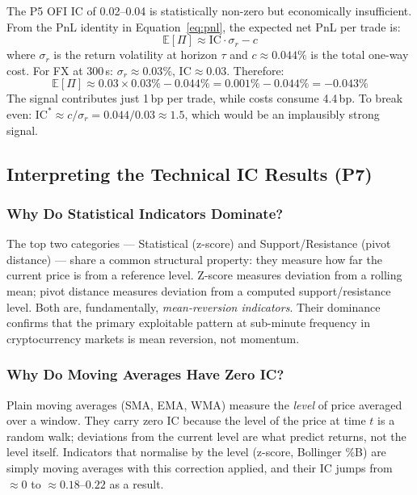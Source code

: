 \documentclass[12pt,a4paper]{article}
\theoremstyle{definition}
\theoremstyle{remark}
\newcommand{\IC}{\mathrm{IC}}
\begin{document}
The P5 OFI IC of 0.02--0.04 is statistically non-zero but
economically insufficient. From the PnL identity in
Equation~\eqref{eq:pnl}, the expected net PnL per trade is:
\begin{equation}
  \mathbb{E}[\Pi] \approx \IC \cdot \sigma_r - c
\end{equation}
where $\sigma_r$ is the return volatility at horizon $\tau$
and $c\approx 0.044\%$ is the total one-way cost. For FX at 300\,s:
$\sigma_r\approx 0.03\%$, $\IC\approx 0.03$. Therefore:
\begin{equation}
  \mathbb{E}[\Pi] \approx 0.03 \times 0.03\% - 0.044\%
    = 0.001\% - 0.044\% = -0.043\%
\end{equation}
The signal contributes just 1\,bp per trade, while costs consume 4.4\,bp.
To break even: $\IC^* \approx c / \sigma_r = 0.044/0.03 \approx 1.5$,
which would be an implausibly strong signal.

\subsection{Interpreting the Technical IC Results (P7)}

\subsubsection{Why Do Statistical Indicators Dominate?}

The top two categories --- Statistical (z-score) and
Support/Resistance (pivot distance) --- share a common structural
property: they measure how far the current price is from a reference
level. Z-score measures deviation from a rolling mean; pivot distance
measures deviation from a computed support/resistance level. Both are,
fundamentally, \emph{mean-reversion indicators}. Their dominance
confirms that the primary exploitable pattern at sub-minute frequency
in cryptocurrency markets is mean reversion, not momentum.

\subsubsection{Why Do Moving Averages Have Zero IC?}

Plain moving averages (SMA, EMA, WMA) measure the \emph{level} of
price averaged over a window. They carry zero IC because the
level of the price at time $t$ is a random walk; deviations from the
current level are what predict returns, not the level itself.
Indicators that normalise by the level (z-score, Bollinger \%B) are
simply moving averages with this correction applied, and their IC
jumps from $\approx 0$ to $\approx 0.18$--$0.22$ as a result.
\end{document}
